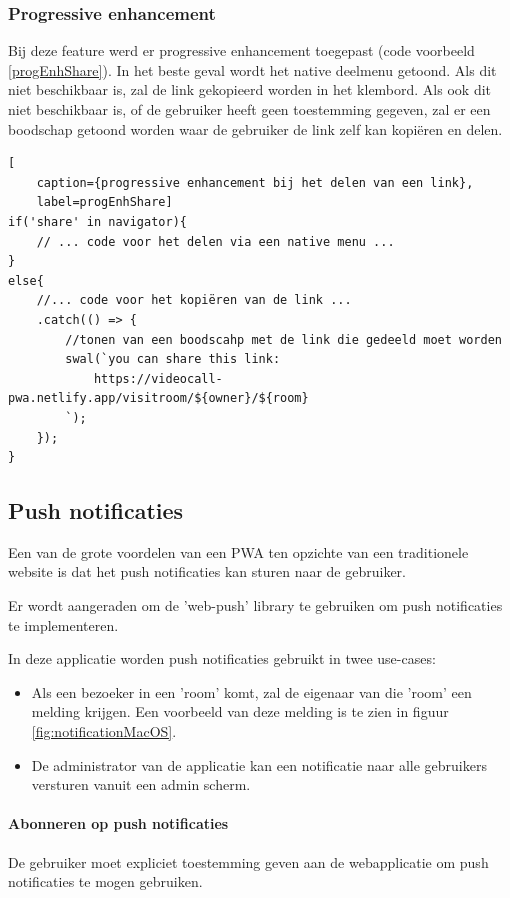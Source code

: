 		\subsubsection{Progressive enhancement}

			Bij deze feature werd er progressive enhancement toegepast (code voorbeeld \ref{progEnhShare}). 
			In het beste geval wordt het native deelmenu getoond. Als dit niet beschikbaar is, zal de link gekopieerd worden in het klembord.
			Als ook dit niet beschikbaar is, of de gebruiker heeft geen toestemming gegeven, zal er een boodschap getoond worden waar de gebruiker de link zelf kan kopiëren en delen.
		
\begin{lstlisting}[
	caption={progressive enhancement bij het delen van een link},
	label=progEnhShare]
if('share' in navigator){
	// ... code voor het delen via een native menu ...
}
else{
	//... code voor het kopiëren van de link ...
	.catch(() => {
		//tonen van een boodscahp met de link die gedeeld moet worden
		swal(`you can share this link:
			https://videocall-pwa.netlify.app/visitroom/${owner}/${room}
		`);
	});
}
\end{lstlisting}


	\subsection{Push notificaties}
	
		Een van de grote voordelen van een PWA ten opzichte van een traditionele website is dat het push notificaties kan sturen naar de gebruiker.
		
		Er wordt aangeraden om de 'web-push' library te gebruiken om push notificaties te implementeren.
		
		In deze applicatie worden push notificaties gebruikt in twee use-cases:
		\begin{itemize}
			\item 	Als een bezoeker in een 'room' komt, zal de eigenaar van die 'room' een melding krijgen. Een voorbeeld van deze melding is te zien in figuur \ref{fig:notificationMacOS}.
			\item 	De administrator van de applicatie kan een notificatie naar alle gebruikers versturen vanuit een admin scherm.
		\end{itemize}	
		
		\paragraph{Abonneren op push notificaties}
			 De gebruiker moet expliciet toestemming geven aan de webapplicatie om push notificaties te mogen gebruiken.
			
